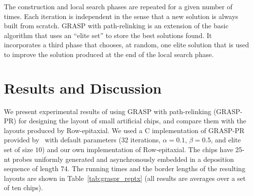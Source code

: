 \documentclass[english]{lni}
\newcommand{\ignore}[1]{}
\begin{document}
The construction and local search phases are repeated for a given number of
times. Each iteration is independent in the sense that a new solution is always built
from scratch. GRASP with path-relinking is an extension of the basic algorithm
that uses an ``elite set'' to store the best solutions found. It incorporates
a third phase that chooses, at random, one elite solution that is used
to improve the solution produced at the end of the local search phase.

\ignore{
Solutions $p$ and $q$ are combined as follows. For every location
$k = 1, \ldots, n$, the path-relinking algorithm attempts to exchange facility
$p_k$ assigned to location $k$ in  solution $p$ with facility $q_k$ assigned to
location $k$ in the elite solution. In order to keep the solution $p$ feasible,
it exchanges $p_k$ with $p_l$, where $p_l = q_k$. This exchange is
performed only if it results in a better solution. The result of the
path-relinking phase is a solution $r$ that is as good as $p$ and $q$.
For more details on GRASP with path-relinking, we refer to~\cite{OLIVEIRA04}.
}

\section{Results and Discussion}
\label{sec:results}

We present experimental results of using GRASP with path-relinking (GRASP-PR)
for designing the layout of small artificial chips, and compare them with the
layouts produced by Row-epitaxial. We used a C implementation of GRASP-PR provided
by~\cite{OLIVEIRA04} with default parameters (32 iterations, $\alpha=0.1$,
$\beta=0.5$, and elite set of size $10$) and our own implementation of
Row-epitaxial. The chips have 25-nt probes uniformly generated and asynchronously
embedded in a deposition sequence of length 74. The running times and the border
lengths of the resulting layouts are shown in Table~\ref{tab:graspr_reptx} (all
results are averages over a set of ten chips).

\ignore{
The main routine takes
three arguments: matrices $F$ and $D$ and the dimension of the problem~$n$ (in
our case, the number of spots or probes). We generated the matrices using the
formulations presented in Section \ref{sec:qap}.
}
\end{document}
